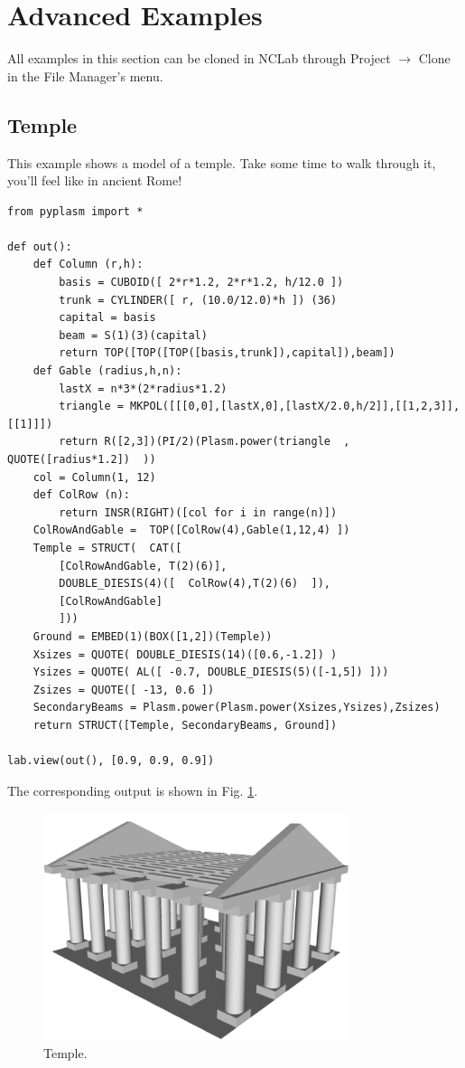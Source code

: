 \documentclass[article,A4,12pt]{llncs}
\begin{document}
\section{Advanced Examples}

All examples in this section can be cloned in NCLab through 
Project $\rightarrow$ Clone in the File Manager's menu.

\subsection{Temple}

This example shows a model of a temple. Take some 
time to walk through it, you'll feel like in ancient Rome!
{\small
\begin{verbatim}
from pyplasm import *

def out():
    def Column (r,h):
        basis = CUBOID([ 2*r*1.2, 2*r*1.2, h/12.0 ]) 
        trunk = CYLINDER([ r, (10.0/12.0)*h ]) (36)
        capital = basis
        beam = S(1)(3)(capital) 
        return TOP([TOP([TOP([basis,trunk]),capital]),beam])
    def Gable (radius,h,n): 
        lastX = n*3*(2*radius*1.2)
        triangle = MKPOL([[[0,0],[lastX,0],[lastX/2.0,h/2]],[[1,2,3]],[[1]]])
        return R([2,3])(PI/2)(Plasm.power(triangle  , QUOTE([radius*1.2])  ))
    col = Column(1, 12)
    def ColRow (n): 
        return INSR(RIGHT)([col for i in range(n)])
    ColRowAndGable =  TOP([ColRow(4),Gable(1,12,4) ])
    Temple = STRUCT(  CAT([
        [ColRowAndGable, T(2)(6)], 
        DOUBLE_DIESIS(4)([  ColRow(4),T(2)(6)  ]), 
        [ColRowAndGable] 
        ]))
    Ground = EMBED(1)(BOX([1,2])(Temple))
    Xsizes = QUOTE( DOUBLE_DIESIS(14)([0.6,-1.2]) )
    Ysizes = QUOTE( AL([ -0.7, DOUBLE_DIESIS(5)([-1,5]) ]))
    Zsizes = QUOTE([ -13, 0.6 ])
    SecondaryBeams = Plasm.power(Plasm.power(Xsizes,Ysizes),Zsizes)
    return STRUCT([Temple, SecondaryBeams, Ground])

lab.view(out(), [0.9, 0.9, 0.9])
\end{verbatim}
}
\noindent
The corresponding output is shown in Fig. \ref{fig:temple}.

\begin{figure}[!ht]
\begin{center}
\includegraphics[width=0.8\textwidth]{img/temple.png}
\end{center}
\vspace{-2mm}
\caption{Temple.}
\label{fig:temple}
\end{figure}
\noindent
\end{document}
